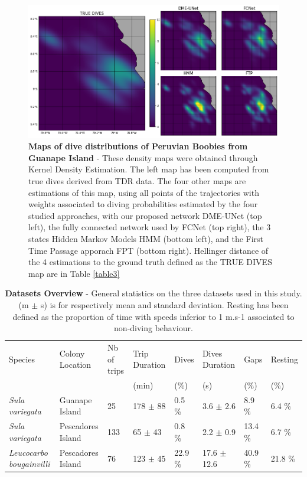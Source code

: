 \documentclass{article}
\begin{document}
\begin{figure}[h]
  \centering
  \includegraphics[scale=0.5]{figure5.png}
  \caption{\textbf{Maps of dive distributions of Peruvian Boobies from Guanape Island} - These density maps were obtained through Kernel Density Estimation. The left map has been computed from true dives derived from TDR data. The four other maps are estimations of this map, using  all points of the trajectories with weights associated to diving probabilities estimated by the four studied approaches,  with our proposed network DME-UNet (top left), the fully connected network used by \citep{browning_predicting_2018}  FCNet (top right), the 3 states Hidden Markov Models HMM (bottom left), and the First Time Passage apporach FPT (bottom right). Hellinger distance of the 4 estimations to the ground truth defined as the TRUE DIVES map are in Table \ref{table3}}
  \label{figure5}
\end{figure}

\begin{table}[h]
 \caption{\textbf{Datasets Overview} - General statistics on the three datasets used in this study. (m $\pm$ s) is for respectively mean and standard deviation. Resting has been defined as the proportion of time with speeds inferior to 1 m.s-1 associated to non-diving behaviour.}
  \centering
  \begin{tabular}{llllllll}
    \toprule
    Species  &  Colony Location & Nb of trips  & Trip Duration & Dives  & Dives Duration & Gaps & Resting \\
      &    &     & (min) & (\%) & (s) & (\%) & (\%) \\
    \midrule
    \textit{Sula variegata}         & Guanape Island    & 25   & 178 $\pm$ 88  & 0.5 \%  & 3.6 $\pm$ 2.6 & 8.9 \% & 6.4 \%\\
    \textit{Sula variegata}         & Pescadores Island & 133 & 65 $\pm$ 43  & 0.8 \%  & 2.2 $\pm$ 0.9  & 13.4 \% & 6.7 \%\\
    \textit{Leucocarbo bougainvilli}& Pescadores Island & 76   & 123 $\pm$ 45  & 22.9 \%  & 17.6 $\pm$ 12.6 & 40.9 \% & 21.8 \%\\
    \bottomrule
  \end{tabular}
  \label{table1}
\end{table}
\end{document}
